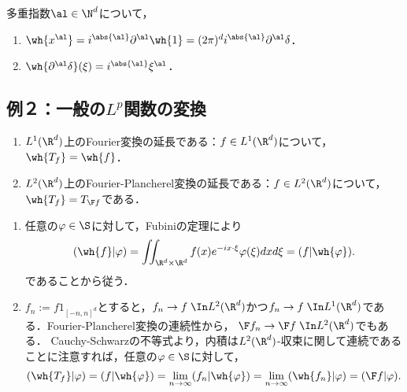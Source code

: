 \documentclass[uplatex,dvipdfmx]{jsreport}
\begin{document}
\begin{example}[多項式はDelta分布の微分に移る]
    多重指数$\al\in\N^d$について，
    \begin{enumerate}
        \item $\wh{x^\al}=i^{\abs{\al}}\partial^\al\wh{1}=(2\pi)^di^{\abs{\al}}\partial^\al\delta$．
        \item $\wh{\partial^\al\delta}(\xi)=i^{\abs{\al}}\xi^\al$．
    \end{enumerate}
\end{example}

\subsection{例２：一般の$L^p$関数の変換}

\begin{proposition}[整合性]\mbox{}
    \begin{enumerate}
        \item $L^1(\R^d)$上のFourier変換の延長である：$f\in L^1(\R^d)$について，$\wh{T_f}=\wh{f}$．
        \item $L^2(\R^d)$上のFourier-Plancherel変換の延長である：$f\in L^2(\R^d)$について，$\wh{T_f}=T_{\F f}$である．
    \end{enumerate}
\end{proposition}
\begin{Proof}\mbox{}
    \begin{enumerate}
        \item 任意の$\varphi\in\S$に対して，Fubiniの定理により
        \[(\wh{f}|\varphi)=\iint_{\R^d\times\R^d}f(x)e^{-ix\cdot \xi}\varphi(\xi)dxd\xi=(f|\wh{\varphi}).\]
        であることから従う．
        \item $f_n:=f1_{[-n,n]^d}$とすると，$f_n\to f\;\In L^2(\R^d)$かつ$f_n\to f\;\In L^1(\R^d)$である．Fourier-Plancherel変換の連続性から，
        $\F f_n\to\F f\;\In L^2(\R^d)$でもある．
        Cauchy-Schwarzの不等式より，内積は$L^2(\R^d)$-収束に関して連続であることに注意すれば，任意の$\varphi\in\S$に対して，
        \[(\wh{T_f}|\varphi)=(f|\wh{\varphi})=\lim_{n\to\infty}(f_n|\wh{\varphi})=\lim_{n\to\infty}(\wh{f_n}|\varphi)=(\F f|\varphi).\]
    \end{enumerate}
\end{Proof}
\end{document}
